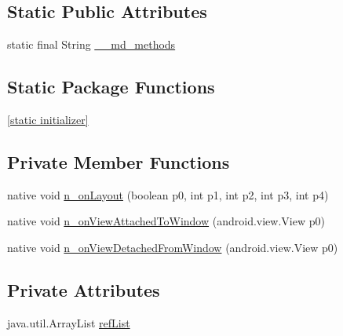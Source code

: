 \subsection*{Static Public Attributes}
\begin{CompactItemize}
\item 
static final String \hyperlink{classmd5270abb39e60627f0f200893b490a1ade_1_1_button_renderer_a6804b17a4e0acb62c327822a4dea5b2}{\_\-\_\-md\_\-methods}
\end{CompactItemize}
\subsection*{Static Package Functions}
\begin{CompactItemize}
\item 
\hyperlink{classmd5270abb39e60627f0f200893b490a1ade_1_1_button_renderer_185a2314a4c48ba4c84aff8feb113b1e}{\mbox{[}static initializer\mbox{]}}
\end{CompactItemize}
\subsection*{Private Member Functions}
\begin{CompactItemize}
\item 
native void \hyperlink{classmd5270abb39e60627f0f200893b490a1ade_1_1_button_renderer_fd8f463e834eac0c0aa3ec80c6a310bc}{n\_\-onLayout} (boolean p0, int p1, int p2, int p3, int p4)
\item 
native void \hyperlink{classmd5270abb39e60627f0f200893b490a1ade_1_1_button_renderer_aac07254eddcd87b062e694ba6db6bb0}{n\_\-onViewAttachedToWindow} (android.view.View p0)
\item 
native void \hyperlink{classmd5270abb39e60627f0f200893b490a1ade_1_1_button_renderer_8f2983bfd636ed8d8a82d46e9900e463}{n\_\-onViewDetachedFromWindow} (android.view.View p0)
\end{CompactItemize}
\subsection*{Private Attributes}
\begin{CompactItemize}
\item 
java.util.ArrayList \hyperlink{classmd5270abb39e60627f0f200893b490a1ade_1_1_button_renderer_2a4a0404703b01e8d3b5f88cd8313a90}{refList}
\end{CompactItemize}


